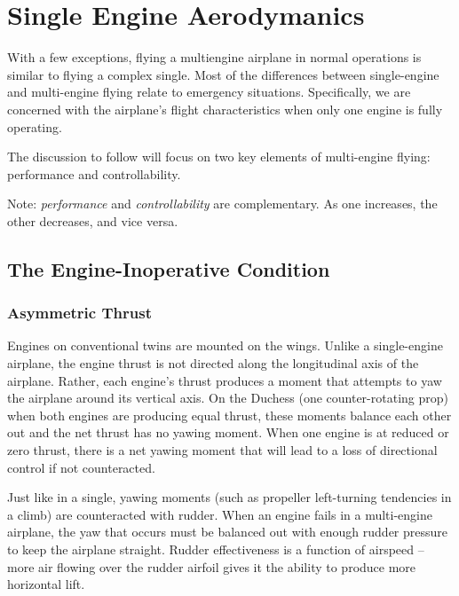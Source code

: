 \chapter{Single Engine Aerodymanics}


With a few exceptions, flying a multiengine airplane in normal operations is similar to flying a
complex single. Most of the differences between single-engine and multi-engine flying relate to
emergency situations. Specifically, we are concerned with the airplane’s flight characteristics
when only one engine is fully operating.

The discussion to follow will focus on two key elements of multi-engine flying: performance and controllability.

Note: \emph{performance} and \emph{controllability} are complementary. As one increases, the other decreases, and vice versa.

\section{The Engine-Inoperative Condition}

\subsection{Asymmetric Thrust}

Engines on conventional twins are mounted on the wings. Unlike a single-engine airplane, the engine thrust is not
directed along the longitudinal axis of the airplane. Rather, each engine’s thrust produces a moment that attempts to
yaw the airplane around its vertical axis. On the Duchess (one counter-rotating prop) when both engines are
producing equal thrust, these moments balance each other out and the net thrust has no yawing moment. When one
engine is at reduced or zero thrust, there is a net yawing moment that will lead to a loss of directional control if not
counteracted.

Just like in a single, yawing moments (such as propeller left-turning tendencies in a climb) are counteracted with
rudder. When an engine fails in a multi-engine airplane, the yaw that occurs must be balanced out with enough
rudder pressure to keep the airplane straight. Rudder effectiveness is a function of airspeed – more air flowing over
the rudder airfoil gives it the ability to produce more horizontal lift.

